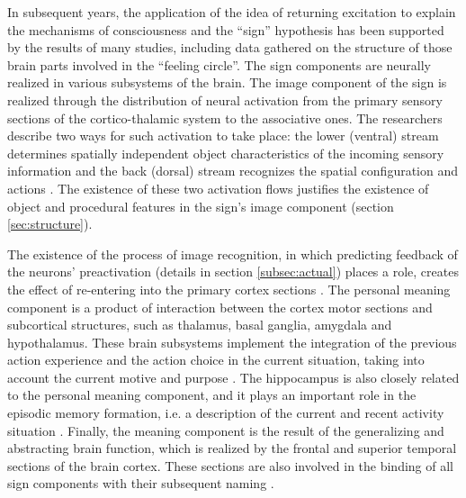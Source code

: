 \documentclass[12pt]{scrartcl}
\begin{document}
	In subsequent years, the application of the idea of returning excitation to explain the mechanisms of consciousness and the ``sign'' hypothesis has been supported by the results of many studies, including data gathered on the structure of those brain parts involved in the ``feeling circle''. The sign components are neurally realized in various subsystems of the brain. The image component of the sign is realized through the distribution of neural activation from the primary sensory sections of the cortico-thalamic system to the associative ones. The researchers describe two ways for such activation to take place: the lower (ventral) stream determines spatially independent object characteristics of the incoming sensory information and the back (dorsal) stream recognizes the spatial configuration and actions \cite{Grossberg2014}. The existence of these two activation flows justifies the existence of object and procedural features in the sign's image component (section \ref{sec:structure}).
	
	The existence of the process of image recognition, in which predicting feedback of the neurons’ preactivation (details in section \ref{subsec:actual}) places a role, creates the effect of re-entering into the primary cortex sections \cite{Edelmen1981,Ivanitsky1996}. The personal meaning component is a product of interaction between the cortex motor sections and subcortical structures, such as thalamus, basal ganglia, amygdala and hypothalamus. These brain subsystems implement the integration of the previous action experience and the action choice in the current situation, taking into account the current motive and purpose \cite{Gurney2001}. The hippocampus is also closely related to the personal meaning component, and it plays an important role in the episodic memory formation, i.e. a description of the current and recent activity situation \cite{Rolls2010}. Finally, the meaning component is the result of the generalizing and abstracting brain function, which is realized by the frontal and superior temporal sections of the brain cortex. These sections are also involved in the binding of all sign components with their subsequent naming \cite{Friederici2015,Pulvermuller2013}.
	
\end{document}
